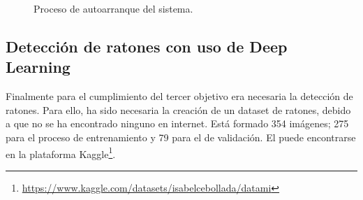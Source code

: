 \begin{figure}[h!]
  \begin{center}
    \hspace{1mm}
    \hspace{1mm}
    \hspace{1mm}
  \end{center}
\caption{Proceso de autoarranque del sistema.} \label{fig:autoarranque}
\end{figure}

\subsection{Detección de ratones con uso de Deep Learning}
Finalmente para el cumplimiento del tercer objetivo era necesaria la detección de ratones. Para ello, ha sido necesaria la creación de un dataset de ratones, debido a que no se ha encontrado ninguno en internet. Está formado 354 imágenes; 275 para el proceso de entrenamiento y 79 para el de validación. El puede encontrarse en la plataforma Kaggle\footnote{\url{https://www.kaggle.com/datasets/isabelcebollada/datami}}.\\

